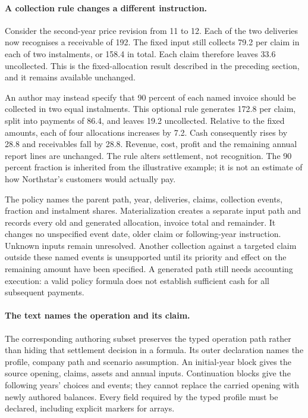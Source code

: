 \paragraph{A collection rule changes a different instruction.}
Consider the second-year price revision from 11 to 12. Each of the two deliveries
now recognises a receivable of 192. The fixed input still collects 79.2 per claim
in each of two instalments, or 158.4 in total. Each claim therefore leaves 33.6
uncollected. This is the fixed-allocation result described in the preceding
section, and it remains available unchanged.

An author may instead specify that 90 percent of each named invoice should be
collected in two equal instalments. This optional rule generates 172.8 per
claim, split into payments of 86.4, and leaves 19.2 uncollected. Relative to the
fixed amounts, each of four allocations increases by 7.2. Cash consequently
rises by 28.8 and receivables fall by 28.8. Revenue, cost, profit and the remaining
annual report lines are unchanged. The rule alters settlement, not recognition.
The 90 percent fraction is inherited from the illustrative example; it is not
an estimate of how Northstar's customers would actually pay.

The policy names the parent path, year, deliveries, claims, collection events,
fraction and instalment shares. Materialization creates a separate input path
and records every old and generated allocation, invoice total and remainder.
It changes no unspecified event date, older claim or following-year instruction.
Unknown inputs remain unresolved. Another collection against a targeted claim
outside these named events is unsupported until its priority and effect on the
remaining amount have been specified. A generated path still needs accounting
execution: a valid policy formula does not establish sufficient cash for all
subsequent payments.

\paragraph{The text names the operation and its claim.}
The corresponding authoring subset preserves the typed operation path rather
than hiding that settlement decision in a formula. Its outer declaration names
the profile, company path and scenario assumption. An initial-year block gives
the source opening, claims, assets and annual inputs. Continuation blocks give
the following years' choices and events; they cannot replace the carried opening
with newly authored balances. Every field required by the typed profile must
be declared, including explicit markers for arrays.

